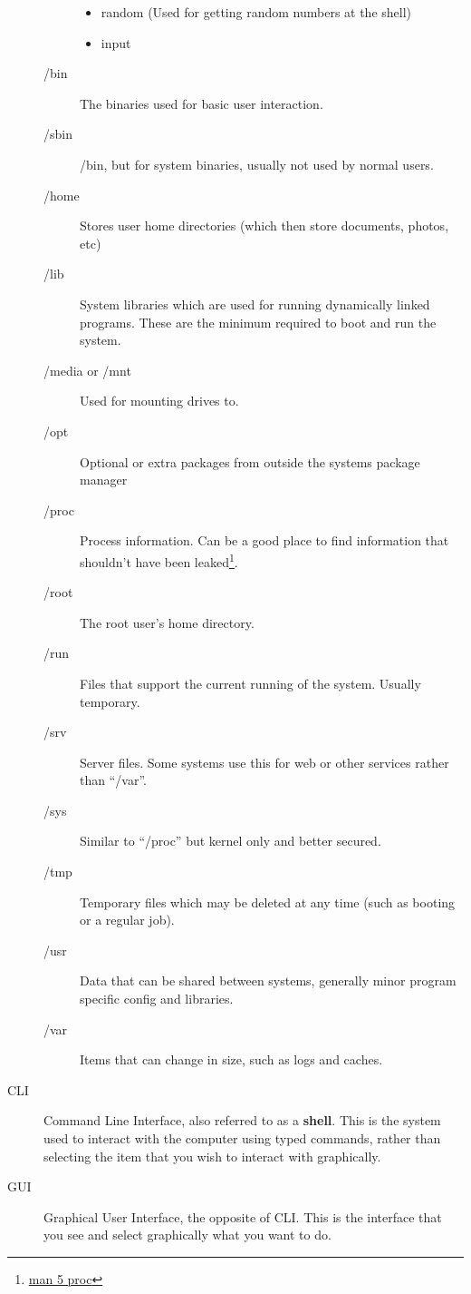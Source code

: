 \begin{description}
\begin{description}
\begin{itemize}
							\item random (Used for getting random numbers at the shell)
							\item input
						\end{itemize}
					\item[/bin] The binaries used for basic user interaction.
					\item[/sbin] /bin, but for system binaries, usually not used by normal users.
					\item[/home] Stores user home directories (which then store documents, photos, etc)
					\item[/lib] System libraries which are used for running dynamically linked programs.
						These are the minimum required to boot and run the system.
					\item[/media or /mnt] Used for mounting drives to.
					\item[/opt] Optional or extra packages from outside the systems package manager
					\item[/proc] Process information. Can be a good place to find information that shouldn't have been leaked\footnote{\href{http://linux.die.net/man/5/proc}{man 5 proc}}.
					\item[/root] The root user's home directory.
					\item[/run] Files that support the current running of the system. Usually temporary.
					\item[/srv] Server files. Some systems use this for web or other services rather than ``/var''.
					\item[/sys] Similar to ``/proc'' but kernel only and better secured.
					\item[/tmp] Temporary files which may be deleted at any time (such as booting or a regular job).
					\item[/usr] Data that can be shared between systems, generally minor program specific config and libraries.
					\item[/var] Items that can change in size, such as logs and caches.
				\end{description}
				\item[CLI] Command Line Interface, also referred to as a \textbf{shell}.
					This is the system used to interact with the computer using typed commands, rather than selecting the item that you wish to interact with graphically.
				\item[GUI] Graphical User Interface, the opposite of CLI.
					This is the interface that you see and select graphically what you want to do.

\end{description}
